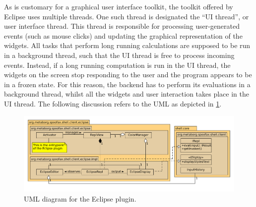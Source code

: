 As is customary for a graphical user interface toolkit, the toolkit offered by
Eclipse uses multiple threads. One such thread is designated the ``UI thread'',
or user interface thread. This thread is responsible for processing
user-generated events (such as mouse clicks) and updating the graphical
representation of the widgets. All tasks that perform long running
calculations are supposed to be run in a background thread, such that the UI
thread is free to process incoming events. Instead, if a long running
computation is run in the UI thread, the widgets on the screen stop responding
to the user and the program appears to be in a frozen state. For this reason,
the backend has to perform its evaluations in a background thread, whilst all
the widgets and user interaction takes place in the UI thread.
The following discussion refers to the UML as depicted in
\cref{fig:uml-eclipse}.

\begin{figure}[h]
  \includegraphics[width=\textwidth]{uml-eclipse}
  \caption{UML diagram for the Eclipse plugin.}
  \label{fig:uml-eclipse}
\end{figure}

